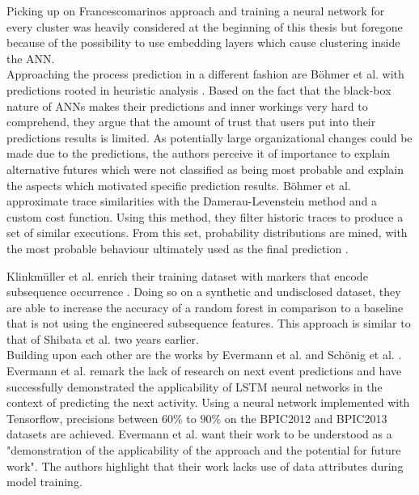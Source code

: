 Picking up on Francescomarinos approach and training a neural network for every cluster was heavily considered at the beginning of this thesis but foregone because of the possibility to use embedding layers which cause clustering inside the ANN.\\

Approaching the process prediction in a different fashion are Böhmer et al. with predictions rooted in heuristic analysis \cite{boehmer2018probability}. Based on the fact that the black-box nature of ANNs makes their predictions and inner workings very hard to comprehend, they argue that the amount of trust that users put into their predictions results is limited. As potentially large organizational changes could be made due to the predictions, the authors perceive it of importance to explain alternative futures which were not classified as being most probable and explain the aspects which motivated specific prediction results.
Böhmer et al. approximate trace similarities with the Damerau-Levenstein method and a custom cost function. Using this method, they filter historic traces to produce a set of similar executions. From this set, probability distributions are mined, with the most probable behaviour ultimately used as the final prediction \cite{boehmer2018probability}.

Klinkmüller et al. enrich their training dataset with markers that encode subsequence occurrence \cite{klinkmuller2018reliablemonitoring}. Doing so on a synthetic and undisclosed dataset, they are able to increase the accuracy of a random forest in comparison to a baseline that is not using the engineered subsequence features. This approach is similar to that of Shibata et al. \cite{shibata2016bipartite} two years earlier.\\



Building upon each other are the works by Evermann et al. \cite{evermann2016} and Schönig et al. \cite{schoenig2018}. Evermann et al. remark the lack of research on next event predictions and have successfully demonstrated the applicability of LSTM neural networks in the context of predicting the next activity. Using a neural network implemented with Tensorflow, precisions between $60\%$ to $90\%$ on the BPIC2012 and BPIC2013 datasets are achieved. Evermann et al. want their work to be understood as a "demonstration of the applicability of the approach and the potential for future work". The authors highlight that their work lacks use of data attributes during model training.

